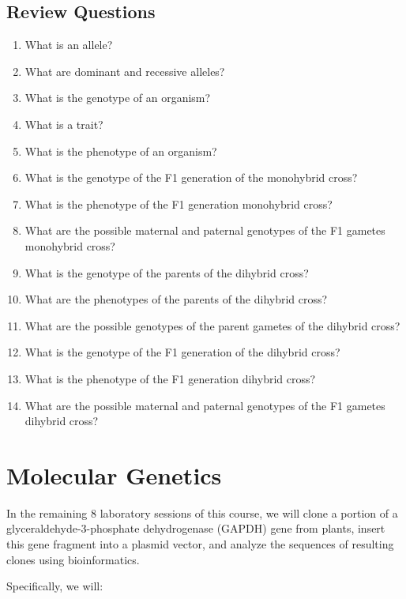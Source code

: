 \documentclass[]{book}
\providecommand{\tightlist}{%
  \setlength{\itemsep}{0pt}\setlength{\parskip}{0pt}}
\begin{document}
\section{Review Questions}\label{review-questions-3}

\begin{enumerate}
\def\labelenumi{\arabic{enumi}.}
\setcounter{enumi}{1}
\tightlist
\item
  What is an allele?
\item
  What are dominant and recessive alleles?
\item
  What is the genotype of an organism?
\item
  What is a trait?
\item
  What is the phenotype of an organism?
\item
  What is the genotype of the F1 generation of the monohybrid cross?
\item
  What is the phenotype of the F1 generation monohybrid cross?
\item
  What are the possible maternal and paternal genotypes of the F1
  gametes monohybrid cross?
\item
  What is the genotype of the parents of the dihybrid cross?
\item
  What are the phenotypes of the parents of the dihybrid cross?
\item
  What are the possible genotypes of the parent gametes of the dihybrid
  cross?
\item
  What is the genotype of the F1 generation of the dihybrid cross?
\item
  What is the phenotype of the F1 generation dihybrid cross?
\item
  What are the possible maternal and paternal genotypes of the F1
  gametes dihybrid cross?
\end{enumerate}

\chapter*{Molecular Genetics}\label{molecular-genetics}

In the remaining 8 laboratory sessions of this course, we will clone a
portion of a glyceraldehyde-3-phosphate dehydrogenase (GAPDH) gene from
plants, insert this gene fragment into a plasmid vector, and analyze the
sequences of resulting clones using bioinformatics.

Specifically, we will:
\end{document}

